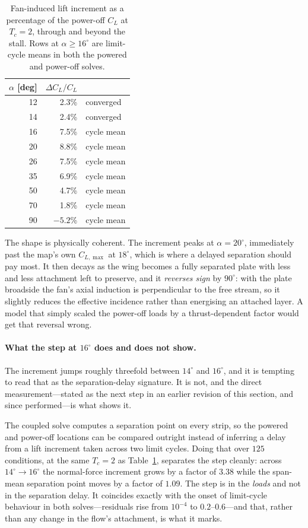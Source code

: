 \documentclass[submit]{aiaa-tc}
\begin{document}
\begin{table}[tb]
  \centering
  \caption{Fan-induced lift increment as a percentage of the power-off
    $C_L$ at $T_c = 2$, through and beyond the stall. Rows at
    $\alpha \geq 16^\circ$ are limit-cycle means in both the powered and
    power-off solves.}
  \label{tab:faninductionp2}
  \begin{tabular}{rrl}
    \hline
    $\alpha$ [deg] & $\Delta C_L / C_L$ & \\
    \hline
    12 & 2.3\% & converged \\
    14 & 2.4\% & converged \\
    16 & 7.5\% & cycle mean \\
    20 & 8.8\% & cycle mean \\
    26 & 7.5\% & cycle mean \\
    35 & 6.9\% & cycle mean \\
    50 & 4.7\% & cycle mean \\
    70 & 1.8\% & cycle mean \\
    90 & $-5.2$\% & cycle mean \\
    \hline
  \end{tabular}
\end{table}

The shape is physically coherent. The increment peaks at
$\alpha = 20^\circ$, immediately past the map's own $C_{L,\max}$ at
$18^\circ$, which is where a delayed separation should pay most. It then
decays as the wing becomes a fully separated plate with less and less
attachment left to preserve, and it \emph{reverses sign} by $90^\circ$:
with the plate broadside the fan's axial induction is perpendicular to
the free stream, so it slightly reduces the effective incidence rather
than energising an attached layer. A model that simply scaled the
power-off loads by a thrust-dependent factor would get that reversal
wrong.

\paragraph{What the step at $16^\circ$ does and does not show.} The
increment jumps roughly threefold between $14^\circ$ and $16^\circ$, and
it is tempting to read that as the separation-delay signature. It is not,
and the direct measurement---stated as the next step in an earlier
revision of this section, and since performed---is what shows it.

The coupled solve computes a separation point on every strip, so the
powered and power-off locations can be compared outright instead of
inferring a delay from a lift increment taken across two limit cycles.
Doing that over $125$ conditions, at the same $T_c = 2$ as
Table~\ref{tab:faninductionp2}, separates the step cleanly: across
$14^\circ \rightarrow 16^\circ$ the normal-force increment grows by a
factor of $3.38$ while the span-mean separation point moves by a factor
of $1.09$. The step is in the \emph{loads} and not in the separation
delay. It coincides exactly with the onset of limit-cycle behaviour in
both solves---residuals rise from $10^{-4}$ to $0.2$--$0.6$---and that,
rather than any change in the flow's attachment, is what it marks.
\end{document}

